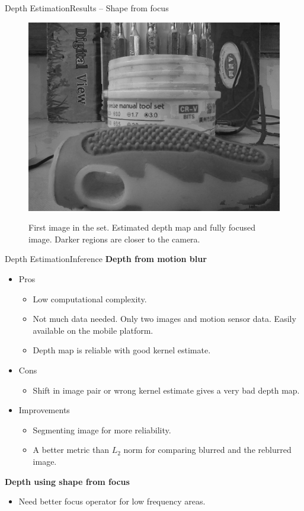 \documentclass{beamer}
\begin{document}
\begin{frame}{Depth Estimation}{Results -- Shape from focus}
\begin{figure}[H]
\begin{center}
\resizebox{35mm}{!} {\includegraphics {../images/focus/eg1/imfocus.png}}
\caption{\scriptsize{First image in the set. Estimated depth map and fully
focused image. Darker regions are closer to the camera.}}
\end{center}
\end{figure}

\end{frame}

\begin{frame}{Depth Estimation}{Inference}
\textbf{Depth from motion blur}
\begin{itemize}
	\item Pros
		\begin{itemize}
			\item Low computational complexity.
			\item Not much data needed. Only two images and motion sensor
			data. Easily available on the mobile platform.
			\item Depth map is reliable with good kernel estimate.
		\end{itemize}
	\item Cons
		\begin{itemize}
			\item Shift in image pair or wrong kernel estimate gives a 
			very bad depth map.
		\end{itemize}
	\item Improvements
		\begin{itemize}
			\item Segmenting image for more reliability.
			\item A better metric than $L_2$ norm for comparing 
			blurred and the reblurred image.
		\end{itemize}
\end{itemize}
\vspace{0.2cm}
\textbf{Depth using shape from focus}
\begin{itemize}
	\item Need better focus operator for low frequency areas.
\end{itemize}
\end{frame}
\end{document}

